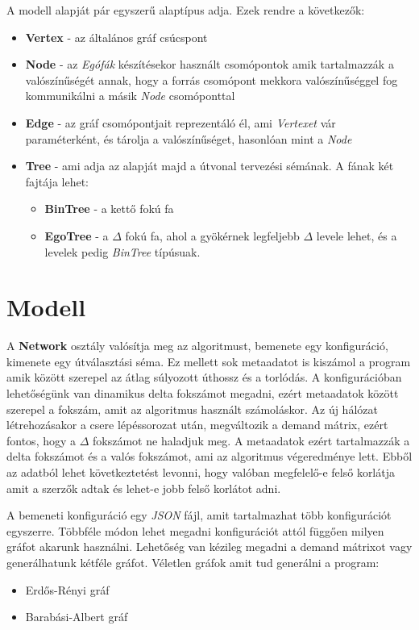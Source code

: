 \documentclass[12pt]{report}
\begin{document}
A modell alapját pár egyszerű alaptípus adja. Ezek rendre a következők:
\begin{itemize}
	\item \textbf{Vertex} - az általános gráf csúcspont
	\item \textbf{Node} - az \textit{Egófák} készítésekor használt csomópontok amik tartalmazzák a valószínűségét annak, hogy a forrás csomópont mekkora valószínűséggel fog kommunikálni a másik \textit{Node} csomóponttal
	\item \textbf{Edge} - az gráf csomópontjait reprezentáló él, ami \textit{Vertexet} vár paraméterként, és tárolja a valószínűséget, hasonlóan mint a \textit{Node}
	\item \textbf{Tree} - ami adja az alapját majd a útvonal tervezési sémának. A fának két fajtája lehet:
	\begin{itemize}
		\item \textbf{BinTree} - a kettő fokú fa
		\item \textbf{EgoTree} - a $\Delta$ fokú fa, ahol a gyökérnek legfeljebb $\Delta$ levele lehet, és a levelek pedig \textit{BinTree} típúsuak.
	\end{itemize}
	
\end{itemize}
	
\section{Modell}

A \textbf{Network} osztály valósítja meg az algoritmust, bemenete egy konfiguráció, kimenete egy útválasztási séma.
Ez mellett sok metaadatot is kiszámol a program amik között szerepel az átlag súlyozott úthossz és a torlódás.
A konfigurációban lehetőségünk van dinamikus delta fokszámot megadni, ezért metaadatok között szerepel a fokszám, amit az algoritmus használt számoláskor.
Az új hálózat létrehozásakor a csere lépéssorozat után, megváltozik a demand mátrix, ezért fontos, hogy a \(\Delta\) fokszámot ne haladjuk meg.
A metaadatok ezért tartalmazzák a delta fokszámot és a valós fokszámot, ami az algoritmus végeredménye lett.  
Ebből az adatból lehet következtetést levonni, hogy valóban megfelelő-e felső korlátja amit a szerzők adtak és lehet-e jobb felső korlátot adni. 

A bemeneti konfiguráció egy \textit{JSON} fájl, amit tartalmazhat több konfigurációt egyszerre.
Többféle módon lehet megadni konfigurációt attól függően milyen gráfot akarunk használni. 
Lehetőség van kézileg megadni a demand mátrixot vagy generálhatunk kétféle gráfot.
Véletlen gráfok amit tud generálni a program:
\begin{itemize}
	\item Erdős-Rényi gráf
	\item Barabási-Albert gráf
\end{itemize}
\end{document}
